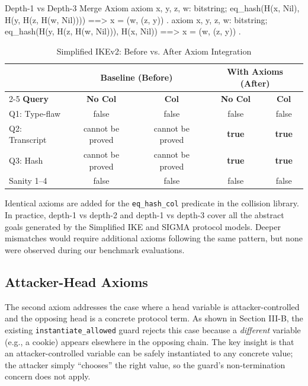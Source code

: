 \documentclass[journal]{IEEEtran}
\begin{document}
\begin{proverifcode}{Depth-1 vs Depth-3 Merge Axiom}
axiom x, y, z, w: bitstring;
  eq_hash(H(x, Nil), H(y, H(z, H(w, Nil)))) ==>
    x = (w, (z, y))
.
axiom x, y, z, w: bitstring;
  eq_hash(H(y, H(z, H(w, Nil))), H(x, Nil)) ==>
    x = (w, (z, y))
.
\end{proverifcode}

\begin{table}[h!]
\centering
\caption{Simplified IKEv2: Before vs. After Axiom Integration}
\label{tab:ike-results}
\renewcommand{\arraystretch}{1.3} 
\begin{tabular}{|l|c|c|c|c|}
\hline
 & \multicolumn{2}{c|}{\textbf{Baseline (Before)}} & \multicolumn{2}{c|}{\textbf{With Axioms (After)}} \\ \cline{2-5}
\textbf{Query} & \textbf{No Col} & \textbf{Col} & \textbf{No Col} & \textbf{Col} \\ \hline
Q1: Type-flaw      & false & false & false & false \\ \hline
Q2: Transcript     & cannot be proved & \cellcolor{red!15}cannot be proved & \cellcolor{green!15}\textbf{true} & \cellcolor{green!15}\textbf{true} \\ \hline
Q3: Hash           & cannot be proved & \cellcolor{red!15}cannot be proved & \cellcolor{green!15}\textbf{true} & \cellcolor{green!15}\textbf{true} \\ \hline
Sanity 1--4        & false & false & false & false \\ \hline
\end{tabular}
\end{table}

Identical axioms are added for the \texttt{eq\_hash\_col} predicate in the collision library. In practice, depth-1 vs depth-2 and depth-1 vs depth-3 cover all the abstract goals generated by the Simplified IKE and SIGMA protocol models. Deeper mismatches would require additional axioms following the same pattern, but none were observed during our benchmark evaluations.

\subsection{Attacker-Head Axioms}

The second axiom addresses the case where a head variable is attacker-controlled and the opposing head is a concrete protocol term. As shown in Section III-B, the existing \texttt{instantiate\_allowed} guard rejects this case because a \emph{different} variable (e.g., a cookie) appears elsewhere in the opposing chain. The key insight is that an attacker-controlled variable can be safely instantiated to any concrete value; the attacker simply ``chooses'' the right value, so the guard's non-termination concern does not apply.
\end{document}
